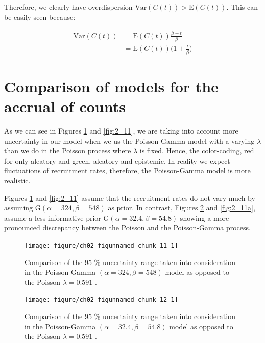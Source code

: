 Therefore, we clearly have overdispersion $\textrm{Var}(C(t))>\textrm{E}(C(t))$. This can be easily seen because:

\begin{align*}
\textrm{Var}(C(t)) &=\textrm{E}(C(t))\frac{\beta+t}{\beta}\\
&=\textrm{E}(C(t))\Bigg ( 1+\frac{t}{\beta} \Bigg)
\end{align*}

\section{Comparison of models for the accrual of counts}

As we can see in Figures \ref{fig:2_10} and \ref{fig:2_11}, we are taking into account more uncertainty in our model when we us the Poisson-Gamma model with a varying $\lambda$ than we do in the Poisson process where $\lambda$ is fixed. Hence, the color-coding, red for only aleatory and green, aleatory and epistemic. In reality we expect fluctuations of recruitment rates, therefore, the Poisson-Gamma model is more realistic.

Figures \ref{fig:2_10} and \ref{fig:2_11} assume that the recruitment rates do not vary much by assuming $\textrm{G}(\alpha = 324, \beta = 548)$ as prior. In contrast, Figures \ref{fig:2_10a} and \ref{fig:2_11a}, assume a less informative prior $\textrm{G}(\alpha = 32.4, \beta = 54.8)$ showing a more pronounced discrepancy between the Poisson and the Poisson-Gamma process.

\begin{figure}
\begin{knitrout}
\color{fgcolor}

{\centering \texttt{[image: figure/ch02\_figunnamed-chunk-11-1]} 

}


\end{knitrout}
  \caption{Comparison of the 95 \% uncertainty range taken into consideration in the Poisson-Gamma $(\alpha = 324, \beta = 548)$ model as opposed to the Poisson $\lambda = 0.591$ \citep{spiegelhalter2011visualizing, pkgacc}.}
  \label{fig:2_10}
\end{figure}


\begin{figure}
\begin{knitrout}
\color{fgcolor}

{\centering \texttt{[image: figure/ch02\_figunnamed-chunk-12-1]} 

}


\end{knitrout}
  \caption{Comparison of the 95 \% uncertainty range taken into consideration in the Poisson-Gamma $(\alpha = 32.4, \beta = 54.8)$ model as opposed to the Poisson $\lambda = 0.591$ \citep{spiegelhalter2011visualizing, pkgacc}.}
  \label{fig:2_10a}
\end{figure}

